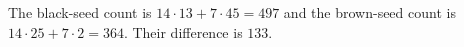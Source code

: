 The black-seed count is $14\cdot13+7\cdot45=497$ and the brown-seed count is $14\cdot25+7\cdot2=364$. Their difference is $\boxed{133}$.

